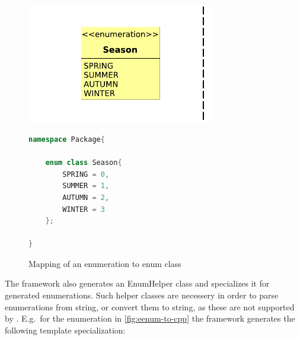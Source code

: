 \begin{figure}[H]
	\begin{center}
		
		\begin{minipage}[c]{\textwidth}
		\begin{minipage}[r]{0.52\textwidth}
			\hfill
			\includegraphics[width=0.735\textwidth]{figures/eenum-to-cpp.pdf}
		\end{minipage}
			\hspace{0.05\textwidth}
		\begin{minipage}[c]{0.25\textwidth}
\begin{lstlisting}[language=C++]
namespace Package{
	
	enum class Season{
		SPRING = 0,
		SUMMER = 1,
		AUTUMN = 2,
		WINTER = 3
	};

}
\end{lstlisting}			
		\end{minipage}
		\end{minipage}
		\caption{Mapping of an enumeration to \protect\cpp{} enum class }
		\label{fig:eenum-to-cpp}
	\end{center}
\end{figure}


The framework also generates an EnumHelper class and specializes it for generated enumerations. Such helper classes are necessery in order to  parse enumerations from string, or convert them to string, as these are not supported by \cpp{}. E.g.\ for the enumeration in \autoref{fig:eenum-to-cpp} the framework generates the following template specialization:

